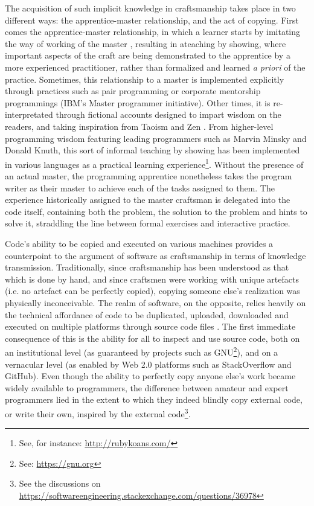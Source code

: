 The acquisition of such implicit knowledge in craftsmanship takes place in two different ways: the apprentice-master relationship, and the act of copying. First comes the apprentice-master relationship, in which a learner starts by  imitating the way of working of the master \citep{sennett_craftsman_2009}, resulting in ateaching by showing, where important aspects of the craft are being demonstrated to the apprentice by a more experienced practitioner, rather than formalized and learned \emph{a priori} of the practice. Sometimes, this relationship to a master is implemented explicitly through practices such as pair programming \citep{williams_pair_2003} or corporate mentorship programmings (IBM's Master programmer initiative). Other times, it is re-interpretated through fictional accounts designed to impart wisdom on the readers, and taking inspiration from Taoism and Zen \citep{james_tao_1987,raymond_new_1996}. From higher-level programming wisdom featuring leading programmers such as Marvin Minsky and Donald Knuth, this sort of informal teaching by showing has been implemented in various languages as a practical learning experience\footnote{See, for instance: \url{http://rubykoans.com/}}. Without the presence of an actual master, the programming apprentice nonetheless takes the program writer as their master to achieve each of the tasks assigned to them. The experience historically assigned to the master craftsman is delegated into the code itself, containing both the problem, the solution to the problem and hints to solve it, straddling the line between formal exercises and interactive practice.

Code's ability to be copied and executed on various machines provides a counterpoint to the argument of software as craftsmanship in terms of knowledge transmission. Traditionally, since craftsmanship has been understood as that which is done by hand, and since craftsmen were working with unique artefacts (i.e. no artefact can be perfectly copied), copying someone else's realization was physically inconceivable. The realm of software, on the opposite, relies heavily on the technical affordance of code to be duplicated, uploaded, downloaded and executed on multiple platforms through source code files \citep{manovich_language_2001}. The first immediate consequence of this is the ability for all to inspect and use source code, both on an institutional level (as guaranteed by projects such as GNU\footnote{See: \url{https://gnu.org}}), and on a vernacular level (as enabled by Web 2.0 platforms such as StackOverflow and GitHub). Even though the ability to perfectly copy anyone else's work became widely available to programmers, the difference between amateur and expert programmers lied in the extent to which they indeed blindly copy external code, or write their own, inspired by the external code\footnote{See the discussions on \url{https://softwareengineering.stackexchange.com/questions/36978}}.

